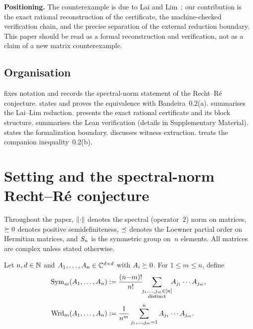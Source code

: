 \smallskip
\noindent\textbf{Positioning.}\enspace
The counterexample is due to Lai and Lim~\cite{LaiLim2020}; our
contribution is the exact rational reconstruction of the certificate,
the machine-checked verification chain, and the precise separation of
the external reduction boundary.  This paper should be read as a
formal reconstruction and verification, not as a claim of a new
matrix counterexample.

\subsection*{Organisation}
 fixes notation and records the spectral-norm
statement of the Recht--R\'e conjecture.
 states and proves the equivalence with
Bandeira~0.2(a).
 summarises the Lai--Lim reduction.
 presents the exact rational certificate and
its block structure.
 summarises the Lean verification
(details in Supplementary Material).
 states the formalization boundary.
 discusses witness extraction.
 treats the companion inequality~0.2(b).

\section{Setting and the spectral-norm Recht--R\'e conjecture}
\label{sec:setting}

Throughout the paper, $\lVert\cdot\rVert$ denotes the spectral
(operator~$2$) norm on matrices, $\succeq 0$ denotes positive
semidefiniteness, $\preceq$ denotes the Loewner partial order on
Hermitian matrices, and $S_n$ is the symmetric group on~$n$ elements.
All matrices are complex unless stated otherwise.

\begin{definition}\label{def:averages}
Let $n,d\in\mathbb{N}$ and $A_1,\dots,A_n\in\mathbb{C}^{d\times d}$ with $A_i\succeq 0$.
For $1\le m\le n$, define
\begin{align}
  \mathrm{Sym}_m(A_1,\dots,A_n)
    &:= \frac{(n{-}m)!}{n!}
        \!\!\sum_{\substack{j_1,\dots,j_m\in[n]\\\text{distinct}}}
        \!\! A_{j_1}\cdots A_{j_m},
    \label{eq:sym}\\[4pt]
  \mathrm{Wrd}_m(A_1,\dots,A_n)
    &:= \frac{1}{n^m}
        \sum_{j_1,\dots,j_m=1}^{n} A_{j_1}\cdots A_{j_m}.
    \label{eq:wrd}
\end{align}
\end{definition}

